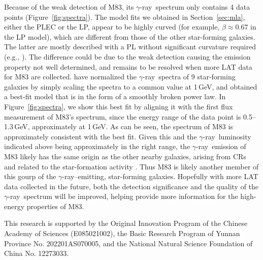 \documentclass[twocolumn]{aastex631}
\newcommand{\gr}{$\gamma$-ray}
\begin{document}
Because of the weak detection of M83, its \gr\ spectrum only contains 4
data points (Figure~\ref{fig:spectra}). The model fits we obtained in
Section~\ref{sec:mla}, either the PLEC or the LP, appear to be highly curved
(for example, $\beta\approx 0.67$ in the LP model), which 
are different from those of the other star-forming galaxies. The latter
are mostly
described with a PL without significant curvature required
(e.g., \citealt{aje+20}). The difference could be due to the weak 
detection causing the emission property not well determined,
and remains to be resolved when more LAT data for M83 are collected.
\citet{aje+20} have normalized the \gr\ spectra of 9 star-forming
galaxies by simply scaling the spectra to a common value at 1\,GeV, and
obtained a best-fit model that is in the form of
a smoothly broken power law. In Figure~\ref{fig:spectra}, we show this best fit
by aligning it with the first flux measurement of M83's spectrum,
since the energy range of the data point is 0.5--1.3\,GeV,
approximately at 1\,GeV.
As can be seen, the spectrum 
of M83 is approximately
consistent with the best fit. Given this and the \gr\ luminosity indicated
above being approximately in the right range, the \gr\ emission of M83 likely 
has the same
origin as the other nearby galaxies, arising from CRs and related to the 
star-formation activity \citep{ack+12}. Thus M83 is likely another member of 
this gourp of the \gr--emitting,
star-forming galaxies. Hopefully with more LAT data collected in the future,
both the detection significance and the quality of the \gr\ spectrum will be 
improved, helping provide more information for the high-energy properties 
of M83.

\begin{acknowledgements}
This research is supported by the Original Innovation Program of the Chinese 
	Academy of Sciences (E085021002), 
	the Basic Research Program of Yunnan Province
No. 202201AS070005, and the National Natural Science Foundation of China
No. 12273033.
\end{acknowledgements}



\end{document}
